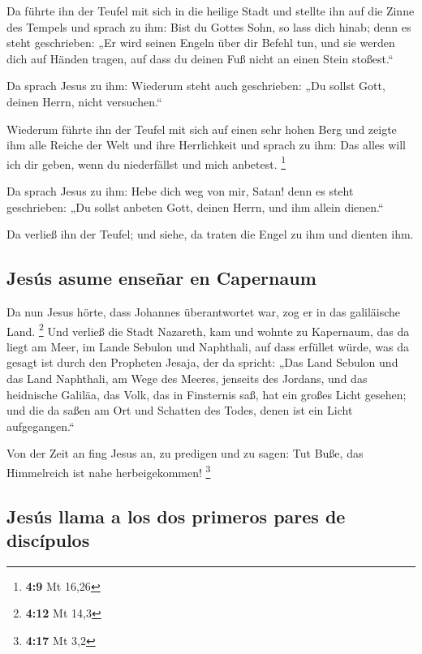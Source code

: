  Da führte ihn der Teufel mit sich in die heilige Stadt
und stellte ihn auf die Zinne des Tempels  und sprach zu
ihm: Bist du Gottes Sohn, so lass dich hinab; denn es steht geschrieben:
„Er wird seinen Engeln über dir Befehl tun, und sie werden dich auf
Händen tragen, auf dass du deinen Fuß nicht an einen Stein stoßest.``

 Da sprach Jesus zu ihm: Wiederum steht auch geschrieben:
„Du sollst Gott, deinen Herrn, nicht versuchen.``

 Wiederum führte ihn der Teufel mit sich auf einen sehr
hohen Berg und zeigte ihm alle Reiche der Welt und ihre Herrlichkeit
 und sprach zu ihm: Das alles will ich dir geben, wenn du
niederfällst und mich anbetest. \footnote{\textbf{4:9} Mt 16,26}

 Da sprach Jesus zu ihm: Hebe dich weg von mir, Satan!
denn es steht geschrieben: „Du sollst anbeten Gott, deinen Herrn, und
ihm allein dienen.``

 Da verließ ihn der Teufel; und siehe, da traten die
Engel zu ihm und dienten ihm.

\hypertarget{jesuxfas-asume-enseuxf1ar-en-capernaum}{%
\subsection{Jesús asume enseñar en
Capernaum}\label{jesuxfas-asume-enseuxf1ar-en-capernaum}}

 Da nun Jesus hörte, dass Johannes überantwortet war, zog
er in das galiläische Land. \footnote{\textbf{4:12} Mt 14,3}
 Und verließ die Stadt Nazareth, kam und wohnte zu
Kapernaum, das da liegt am Meer, im Lande Sebulon und Naphthali,
 auf dass erfüllet würde, was da gesagt ist durch den
Propheten Jesaja, der da spricht:  „Das Land Sebulon und
das Land Naphthali, am Wege des Meeres, jenseits des Jordans, und das
heidnische Galiläa,  das Volk, das in Finsternis saß, hat
ein großes Licht gesehen; und die da saßen am Ort und Schatten des
Todes, denen ist ein Licht aufgegangen.``

 Von der Zeit an fing Jesus an, zu predigen und zu sagen:
Tut Buße, das Himmelreich ist nahe herbeigekommen! \footnote{\textbf{4:17}
  Mt 3,2}

\hypertarget{jesuxfas-llama-a-los-dos-primeros-pares-de-discuxedpulos}{%
\subsection{Jesús llama a los dos primeros pares de
discípulos}\label{jesuxfas-llama-a-los-dos-primeros-pares-de-discuxedpulos}}

